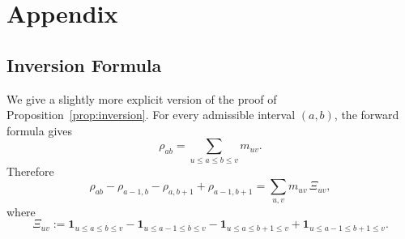 \documentclass[11pt]{article}
\theoremstyle{definition}
\begin{document}
\section{Appendix}
\subsection{Inversion Formula}
\label{app:inversion}

We give a slightly more explicit version of the proof of
Proposition~\ref{prop:inversion}. For every admissible interval \((a,b)\), the
forward formula gives
\[
\rho_{ab}
=
\sum_{u\leq a\leq b\leq v} m_{uv}.
\]
Therefore
\[
\rho_{ab}-\rho_{a-1,b}-\rho_{a,b+1}+\rho_{a-1,b+1}
=
\sum_{u,v} m_{uv}\,\Xi_{uv},
\]
where
\[
\Xi_{uv}
:=
\mathbf 1_{u\leq a\leq b\leq v}
-\mathbf 1_{u\leq a-1\leq b\leq v}
-\mathbf 1_{u\leq a\leq b+1\leq v}
+\mathbf 1_{u\leq a-1\leq b+1\leq v}.
\]
\end{document}
